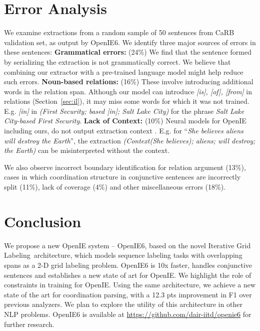 \documentclass[11pt,a4paper]{article}
\newcommand{\longname}{Iterative Grid Labeling}
\begin{document}
 
\section{Error Analysis}
\label{sec:error_analysis}


We examine extractions from a random sample of 50 sentences from CaRB validation set, as output by OpenIE6. We identify three major sources of errors in these sentences: \newline
\textbf{Grammatical errors:} (24\%) We find that the sentence formed by serializing the extraction is not grammatically correct. We believe that combining our extractor with a pre-trained language model might help reduce such errors. \newline
\textbf{Noun-based relations:} (16\%) These involve introducing additional words in the relation span. Although our model can introduce \textit{[is], [of], [from]} in relations (Section~\ref{sec:il}), it may miss some words for which it was not trained. E.g. \textit{[in]} in \textit{(First Security; based [in]; Salt Lake City)} for the phrase \textit{Salt Lake City-based First Security}. \newline
\textbf{Lack of Context:} (10\%) Neural models for OpenIE including ours, do not output extraction context \cite{Mausam&al12}. E.g. for  ``\textit{She believes aliens will destroy the Earth}'', the extraction \textit{(Context(She believes); aliens; will destroy; the Earth)} can be misinterpreted without the context.

We also observe incorrect boundary identification for relation argument (13\%),  cases in which coordination structure in conjunctive sentences are incorrectly split (11\%), lack of coverage (4\%) and other miscellaneous errors (18\%). 
\section{Conclusion}
\label{sec:conclusion}
We propose a new OpenIE system -- OpenIE6, based on the novel \longname\ architecture, which models sequence labeling tasks with overlapping spans as a 2-D grid labeling problem. OpenIE6 is 10x faster, handles conjunctive sentences and establishes a new state of art for OpenIE. We highlight the role of constraints in training for OpenIE. Using the same architecture, we achieve a new state of the art for coordination parsing, with a 12.3 pts improvement in F1 over previous analyzers. We plan to explore the utility of this architecture in other NLP problems. OpenIE6 is available at \url{https://github.com/dair-iitd/openie6} for further research.
\end{document}
